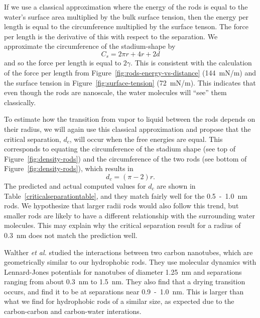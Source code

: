 \documentclass[letterpaper,twocolumn,amsmath,amssymb,prb]{revtex4-1}
\begin{document}
If we use a classical approximation where the energy of the rods is equal to 
the water's surface area multiplied by the bulk surface tension, then the energy per 
length is equal to the circumference multiplied by the surface tenson. The force
per length is the derivative of this with respect to the separation. We approximate 
the circumference of the stadium-shape by
\begin{equation}
C_{s} = 2\pi r +4r+2d
\end{equation}
and so the force per length is equal to $2\gamma$. This 
is consistent with the calculation of the force per length from 
Figure~\ref{fig:rods-energy-vs-distance} (144~mN/m) and the surface tension 
in Figure~\ref{fig:surface-tension} (72~mN/m). This indicates that
even though the rods are nanoscale, the water molecules will ``see'' them classically.

To estimate how the transition from vapor to liquid between the rods depends on their 
radius, we will again use this classical approximation and propose that 
the critical separation, $d_c$, will occur when the free energies are equal. This 
corresponds to equating the circumference of the stadium shape (see 
top of Figure~\ref{fig:density-rods}) and the circumference of the two rods (see bottom
of Figure~\ref{fig:density-rods}), which results in
\begin{equation}
d_c = (\pi-2)r.\label{criticalseparation}
\end{equation}
The predicted and actual computed values for $d_c$ are shown in 
Table~\ref{criticalseparationtable}, and they match fairly well for the 
0.5~-~1.0~nm rods. We hypothesize that larger radii rods
would also follow this trend, but smaller rods are likely to have a different
relationship with the surrounding water molecules. This may explain why the critical
separation result for a radius of 0.3~nm does not match the prediction well.

Walther \emph{et al.}\cite{walther2004hydrodynamic} studied the interactions between two
carbon nanotubes, which are geometrically similar to our hydrophobic rods. 
They use molecular dynamics with Lennard-Jones potentials for
nanotubes of diameter 1.25~nm and separations ranging from about 0.3~nm to 1.5~nm.
They also find that a drying transition occurs, and find it to be at separations near
0.9~-~1.0~nm\cite{walther2004hydrodynamic}. This is larger than
what we find for hydrophobic rods of a similar size, as expected due to the carbon-carbon
and carbon-water interations. 
\end{document}
